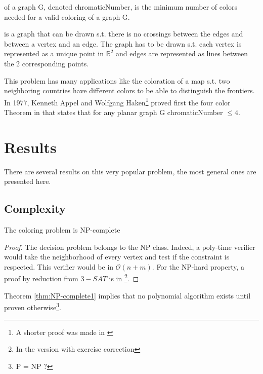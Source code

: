\begin{mydef}
\label{def:ChromaticNumber}
 of a graph G, denoted \gls{chromaticNumber}, is the minimum number of colors needed for a valid coloring of a graph G.
\end{mydef}

\begin{mydef}
\label{def:planarGraph}
 is a graph that can be drawn s.t. there is no crossings between the edges and between a vertex and an edge. The graph has to be drawn s.t. each vertex is represented as a unique point in $\mathbb{R}^2$ and edges are represented as lines between the 2 corresponding points.
\end{mydef}

This problem has many applications like the coloration of a map s.t. two neighboring countries have different colors to be able to distinguish the frontiers. In 1977, Kenneth Appel and Wolfgang Haken\footnote{A shorter proof was made in \cite{4color}} proved first the four color Theorem in \cite{appel1977} that states that for any planar graph G \gls{chromaticNumber} $\leq 4$.



\section{Results}
\label{sec:coloring_results}

There are several results on this very popular problem, the most general ones are presented here.

\subsection{Complexity}

\begin{thm}
\label{thm:NP-complete1}
The coloring problem is NP-complete
\end{thm}

\begin{proof}
The decision problem belongs to the NP class. Indeed, a poly-time verifier would take the neighborhood of every vertex and test if the constraint is respected. This verifier would be in $\mathcal{O}(n+m)$. For the NP-hard property, a proof by reduction from $3-SAT$ is in \cite{Complexity}\footnote{In the version with exercise correction}.
\end{proof}

Theorem \ref{thm:NP-complete1} implies that no polynomial algorithm exists until proven otherwise\footnote{P = NP ?}.

